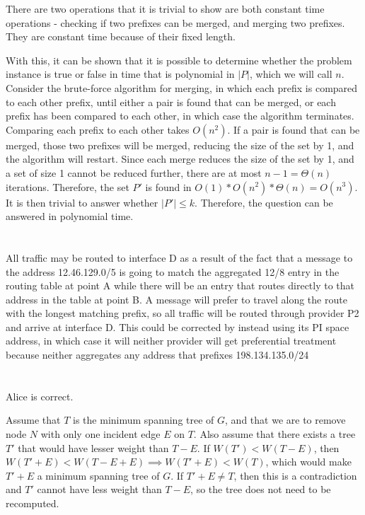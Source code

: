 \documentclass[10pt,a4paper]{article}
\begin{document}
There are two operations that it is trivial to show are both constant time operations - checking if two prefixes can be merged, and merging two prefixes. They are constant time because of their fixed length.

With this, it can be shown that it is possible to determine whether the problem instance is true or false in time that is polynomial in $|P|$, which we will call $n$. Consider the brute-force algorithm for merging, in which each prefix is compared to each other prefix, until either a pair is found that can be merged, or each prefix has been compared to each other, in which case the algorithm terminates. Comparing each prefix to each other takes $O(n^2)$. If a pair is found that can be merged, those two prefixes will be merged, reducing the size of the set by 1, and the algorithm will restart. Since each merge reduces the size of the set by 1, and a set of size 1 cannot be reduced further, there are at most $n-1=\Theta(n)$ iterations. Therefore, the set $P'$ is found in $O(1)*O(n^2)*\Theta(n)=O(n^3)$. It is then trivial to answer whether $|P'|\leq k$. Therefore, the question can be answered in polynomial time.

\section{}
All traffic may be routed to interface D as a result of the fact that a message to the address 12.46.129.0/5 is going to match the aggregated 12/8 entry in the routing table at point A while there will be an entry that routes directly to that address in the table at point B. A message will prefer to travel along the route with the longest matching prefix, so all traffic will be routed through provider P2 and arrive at interface D. This could be corrected by instead using its PI space address, in which case it will neither provider will get preferential treatment because neither aggregates any address that prefixes 198.134.135.0/24

\section{}

Alice is correct. 

Assume that $T$ is the minimum spanning tree of $G$, and that we are to remove node $N$ with only one incident edge $E$ on $T$. Also assume that there exists a tree $T'$ that would have lesser weight than $T - E$. If $W(T') < W(T - E)$, then $W(T' + E) < W(T - E + E) \implies W(T' + E) <  W(T)$, which would make $T' + E$ a minimum spanning tree of $G$. If $T' + E \neq T$, then this is a contradiction and $T'$ cannot have less weight than $T - E$, so the tree does not need to be recomputed.
\end{document}
